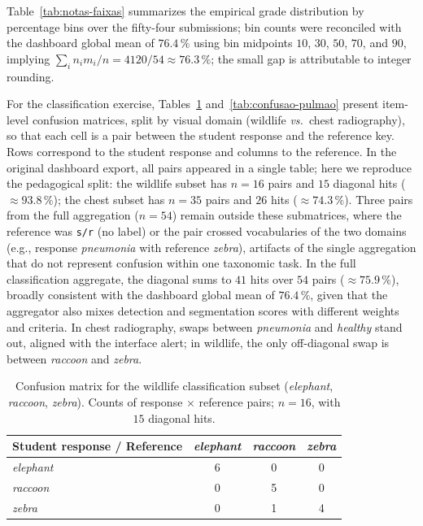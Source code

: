 \documentclass[runningheads]{llncs}
\begin{document}
Table~\ref{tab:notas-faixas} summarizes the empirical grade distribution by percentage bins over the fifty-four submissions; bin counts were reconciled with the dashboard global mean of $76.4\,\%$ using bin midpoints $10$, $30$, $50$, $70$, and $90$, implying $\sum_i n_i m_i / n = 4120/54 \approx 76.3\,\%$; the small gap is attributable to integer rounding.


For the classification exercise, Tables~\ref{tab:confusao-fauna} and~\ref{tab:confusao-pulmao} present item-level confusion matrices, split by visual domain (wildlife \emph{vs.}\ chest radiography), so that each cell is a pair between the student response and the reference key. Rows correspond to the student response and columns to the reference. In the original dashboard export, all pairs appeared in a single table; here we reproduce the pedagogical split: the wildlife subset has $n=16$ pairs and $15$ diagonal hits ($\approx 93.8\,\%$); the chest subset has $n=35$ pairs and $26$ hits ($\approx 74.3\,\%$). Three pairs from the full aggregation ($n=54$) remain outside these submatrices, where the reference was \texttt{s/r} (no label) or the pair crossed vocabularies of the two domains (e.g., response \emph{pneumonia} with reference \emph{zebra}), artifacts of the single aggregation that do not represent confusion within one taxonomic task. In the full classification aggregate, the diagonal sums to $41$ hits over $54$ pairs ($\approx 75.9\,\%$), broadly consistent with the dashboard global mean of $76.4\,\%$, given that the aggregator also mixes detection and segmentation scores with different weights and criteria. In chest radiography, swaps between \emph{pneumonia} and \emph{healthy} stand out, aligned with the interface alert; in wildlife, the only off-diagonal swap is between \emph{raccoon} and \emph{zebra}.

\begin{table}[H]
  \centering
  \caption{Confusion matrix for the wildlife classification subset (\emph{elephant}, \emph{raccoon}, \emph{zebra}). Counts of response $\times$ reference pairs; $n=16$, with $15$ diagonal hits.}
  \label{tab:confusao-fauna}
  \begin{tabular}{lccc}
    \toprule
    Student response / Reference & \emph{elephant} & \emph{raccoon} & \emph{zebra} \\
    \midrule
    \emph{elephant}  & 6 & 0 & 0 \\
    \emph{raccoon}  & 0 & 5 & 0 \\
    \emph{zebra}     & 0 & 1 & 4 \\
    \bottomrule
  \end{tabular}
\end{table}
\end{document}
